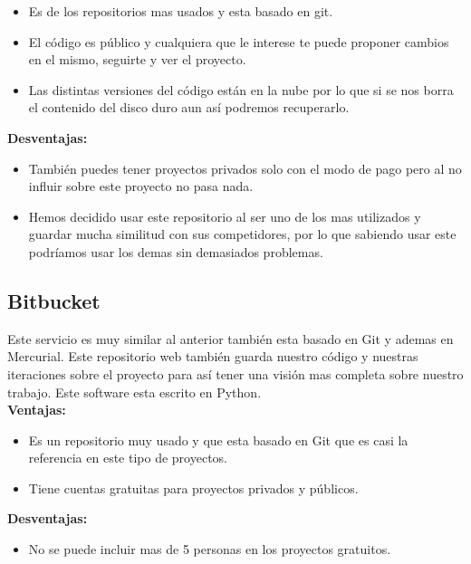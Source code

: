 \begin{itemize}
\item Es de los repositorios mas usados y esta basado en git.

\item El código es público y cualquiera que le interese te puede proponer cambios en el mismo, seguirte y ver el proyecto.

\item Las distintas versiones del código están en la nube por lo que si se nos borra el contenido del disco duro aun así podremos recuperarlo.
\end{itemize}

\textbf{Desventajas:}

\begin{itemize}
\item También puedes tener proyectos privados solo con el modo de pago pero al no influir sobre este proyecto no pasa nada.

\item Hemos decidido usar este repositorio al ser uno de los mas utilizados y guardar mucha similitud con sus competidores, por lo que sabiendo usar este podríamos usar los demas sin demasiados problemas.
\end{itemize}

\subsection{Bitbucket}
Este servicio es muy similar al anterior también esta basado en Git y ademas en Mercurial.
Este repositorio web también guarda nuestro código y nuestras iteraciones sobre el proyecto para así tener una visión mas completa sobre nuestro trabajo.
Este software esta escrito en Python.
\\

\textbf{Ventajas:}
\begin{itemize}

\item Es un repositorio muy usado y que esta basado en Git que es casi la referencia en este tipo de proyectos.

\item Tiene cuentas gratuitas para proyectos privados y públicos.

\end{itemize}

\textbf{Desventajas:}

\begin{itemize}
\item No se puede incluir mas de 5 personas en los proyectos gratuitos.
\end{itemize}





 